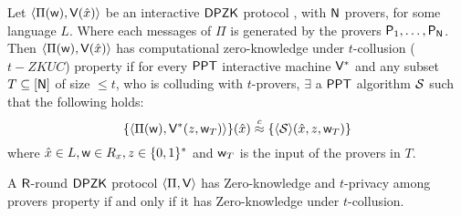 \begin{definition}
	Let $\langle  \Pi ( \mathsf{w} ), \mathsf{V}( \hat{x} )\rangle$ be an interactive $\mathsf{DPZK}$ protocol , with $\mathsf{N}$ provers, for some language $L$. Where each messages of $\Pi$ is generated by the provers $\mathsf{P}_1, \ldots, \mathsf{P}_{\mathsf{N}}$. Then $\langle  \Pi ( \mathsf{w} ), \mathsf{V}( \hat{x} )\rangle$ has computational zero-knowledge under $t$-collusion ($t-ZKUC$) property if for every $\mathsf{PPT}$ interactive machine $\mathsf{V}^*$ and any subset $T\subseteq [\mathsf{N}]$ of size $\leq t$, who is colluding with $t$-provers, $\exists$ a $\mathsf{PPT}$ algorithm $\mathcal{S}$ such that the following holds: 
	$$ \{ \langle \Pi(\mathsf{w}),\mathsf{V}^*(z, \mathsf{w}_T)\rangle \}( \hat{x})  \stackrel{c}{\approx} \{ \langle \mathcal{S} \rangle (\hat{x}, z, \mathsf{w}_T) \} $$
	where $\hat{x} \in L, \mathsf{w} \in R_x, z\in \{0,1\}^*$ and $\mathsf{w}_T$ is the input of the provers in $T$. 
\end{definition}

\begin{theorem}\label{theo:equivalent}
	A $\mathsf{R}$-round $\mathsf{DPZK}$ protocol $\langle \Pi,\mathsf{V}\rangle$ has Zero-knowledge and $t$-privacy among provers property if and only if it has Zero-knowledge under $t$-collusion.
\end{theorem}

